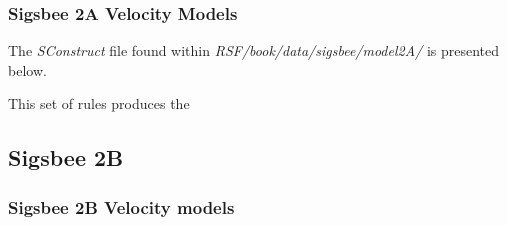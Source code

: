 \subsubsection{Sigsbee 2A Velocity Models}

The \emph{SConstruct} file found within \emph{RSF/book/data/sigsbee/model2A/} is presented below. 

\tiny

\normalsize

This set of rules produces the 



\subsection{Sigsbee 2B}
\subsubsection{Sigsbee 2B Velocity models}

\tiny

\normalsize

